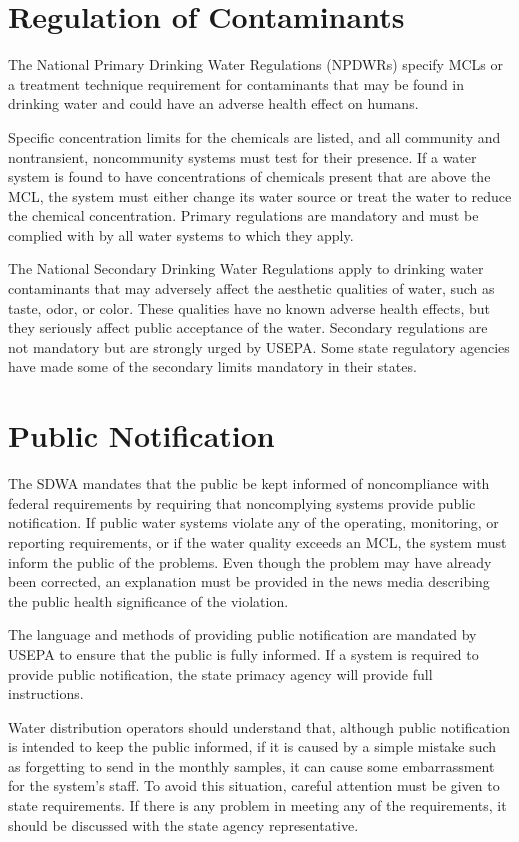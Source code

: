 \documentclass[10pt]{article}
\begin{document}
\section{Regulation of Contaminants}
The National Primary Drinking Water Regulations (NPDWRs) specify MCLs or a treatment technique requirement for contaminants that may be found in drinking water and could have an adverse health effect on humans.

Specific concentration limits for the chemicals are listed, and all community and nontransient, noncommunity systems must test for their presence. If a water system is found to have concentrations of chemicals present that are above the MCL, the system must either change its water source or treat the water to reduce the chemical concentration. Primary regulations are mandatory and must be complied with by all water systems to which they apply.

The National Secondary Drinking Water Regulations apply to drinking water contaminants that may adversely affect the aesthetic qualities of water, such as taste, odor, or color. These qualities have no known adverse health effects, but they seriously affect public acceptance of the water. Secondary regulations are not mandatory but are strongly urged by USEPA. Some state regulatory agencies have made some of the secondary limits mandatory in their states.

\section{Public Notification}
The SDWA mandates that the public be kept informed of noncompliance with federal requirements by requiring that noncomplying systems provide public notification. If public water systems violate any of the operating, monitoring, or reporting requirements, or if the water quality exceeds an MCL, the system must inform the public of the problems. Even though the problem may have already been corrected, an explanation must be provided in the news media describing the public health significance of the violation.

The language and methods of providing public notification are mandated by USEPA to ensure that the public is fully informed. If a system is required to provide public notification, the state primacy agency will provide full instructions.

Water distribution operators should understand that, although public notification is intended to keep the public informed, if it is caused by a simple mistake such as forgetting to send in the monthly samples, it can cause some embarrassment for the system's staff. To avoid this situation, careful attention must be given to state requirements. If there is any problem in meeting any of the requirements, it should be discussed with the state agency representative.
\end{document}
